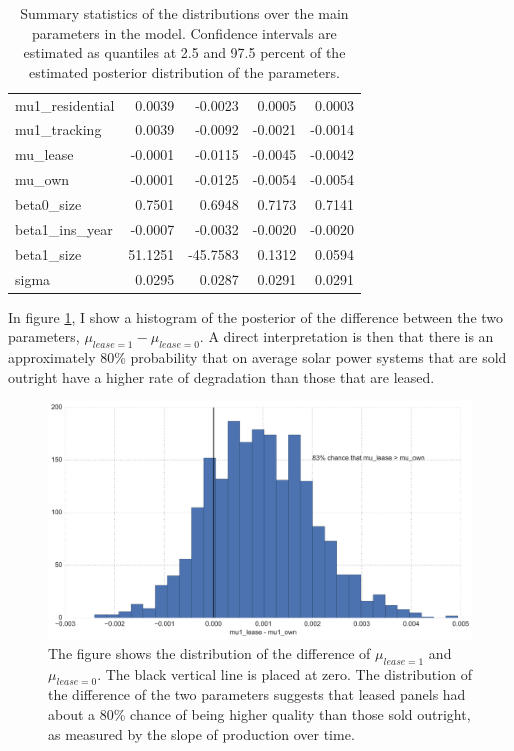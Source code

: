 \documentclass[12pt]{article}
\begin{document}
\begin{table}
{\begin{tabular}{lrrrr}
mu1\_residential  &   0.0039 &  -0.0023 &  0.0005 &   0.0003 \\
mu1\_tracking     &   0.0039 &  -0.0092 & -0.0021 &  -0.0014 \\
mu\_lease         &  -0.0001 &  -0.0115 & -0.0045 &  -0.0042 \\
mu\_own           &  -0.0001 &  -0.0125 & -0.0054 &  -0.0054 \\
beta0\_size       &   0.7501 &   0.6948 &  0.7173 &   0.7141 \\
beta1\_ins\_year   &  -0.0007 &  -0.0032 & -0.0020 &  -0.0020 \\
beta1\_size       &  51.1251 & -45.7583 &  0.1312 &   0.0594 \\
sigma            &   0.0295 &   0.0287 &  0.0291 &   0.0291 \\
\bottomrule
\end{tabular}
}
\label{table_results}
\caption{Summary statistics of the distributions over the main parameters in the model. Confidence intervals are estimated as quantiles at 2.5 and 97.5 percent of the estimated posterior distribution of the parameters.}
\end{table}

In figure \ref{diff_lease}, I show a histogram of the posterior of the difference between the two parameters, $\mu_{lease=1} - \mu_{lease=0}$. A direct interpretation is then that there is an approximately 80\% probability that on average solar power systems that are sold outright have a higher rate of degradation than those that are leased. 

\begin{figure}
	\includegraphics[width=1\textwidth]{figures/diff_lease.png}
	\caption{The figure shows the distribution of the difference of $\mu_{lease=1}$ and $\mu_{lease=0}$. The black vertical line is placed at zero. The distribution of the difference of the two parameters suggests that leased panels had about a 80\% chance of being higher quality than those sold outright, as measured by the slope of production over time.}
	\label{diff_lease}
\end{figure}
\end{document}
